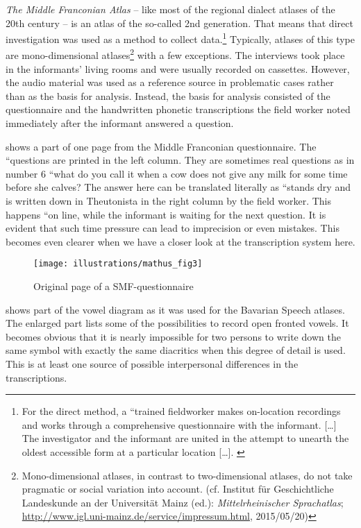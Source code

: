\documentclass[output=paper]{LSP/langsci}
\begin{document}
\textit{The Middle Franconian Atlas} – like most of the regional dialect atlases of the 20th century – is an atlas of the so-called 2nd generation. That means that direct investigation was used as a method to collect data.\footnote{For the direct method, a ``trained fieldworker makes on-location recordings and works through a comprehensive questionnaire with the informant. […] The investigator and the informant are united in the attempt to unearth the oldest accessible form at a particular location […].{\textquotedbl} \citep[502]{konig_investigating_2010}} Typically, atlases of this type are mono-dimensional atlases\footnote{Mono-dimensional atlases, in contrast to two-dimensional atlases, do not take pragmatic or social variation into account. (cf. \citealt{bellmann_mittelrheinischer_????} Institut für Geschichtliche Landeskunde an der Universität Mainz (ed.): \textit{Mittelrheinischer Sprachatlas}; \url{http://www.igl.uni-mainz.de/service/impressum.html}, 2015/05/20)} with a few exceptions. The interviews took place in the informants' living rooms and were usually recorded on cassettes. However, the audio material was used as a reference source in problematic cases rather than as the basis for analysis. Instead, the basis for analysis consisted of the questionnaire and the handwritten phonetic transcriptions the field worker noted immediately after the informant answered a question.

 shows a part of one page from the Middle Franconian questionnaire. The ``questions{\textquotedbl} are printed in the left column. They are sometimes real questions as in number 6 ``what do you call it when a cow does not give any milk for some time before she calves?{\textquotedbl} The answer here can be translated literally as ``stands dry{\textquotedbl} and is written down in Theutonista in the right column by the field worker. This happens  ``on line{\textquotedbl}, while the informant is waiting for the next question. It is evident that such time pressure can lead to imprecision or even mistakes. This becomes even clearer when we have a closer look at the transcription system here.

\begin{figure}[t]
\texttt{[image: illustrations/mathus\_fig3]}
\caption{Original page of a SMF-questionnaire}
\label{fig:mathus:3}
\end{figure}

 shows part of the vowel diagram as it was used for the Bavarian Speech atlases. The enlarged part lists some of the possibilities to record open fronted vowels. It becomes obvious that it is nearly impossible for two persons to write down the same symbol with exactly the same diacritics when this degree of detail is used. This is at least one source of possible interpersonal differences in the transcriptions.
\end{document}
